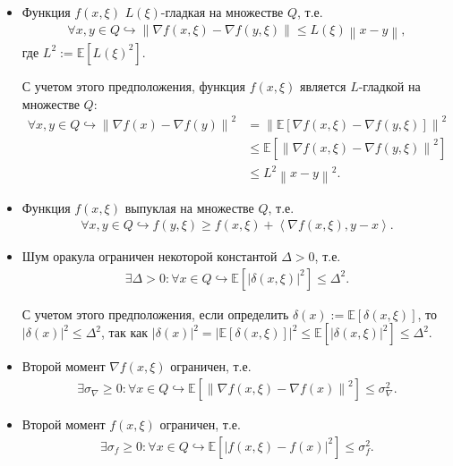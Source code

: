     \begin{itemize}
        \item Функция $f(x, \xi)$ $L(\xi)$-гладкая на множестве $Q$, т.е.
        \begin{align} \label{ass:smooth_stoch}   
            \forall x, y \in Q \hookrightarrow \left\| \nabla f(x, \xi) - \nabla f(y, \xi) \right\| \leq L(\xi) \left\| x - y \right\|,
        \end{align}
        где $L^2 := \mathbb{E} \left[ L(\xi)^2 \right]$.
        
        С учетом этого предположения, функция $f(x, \xi)$ является $L$-гладкой на множестве $Q$:
        \begin{align*}
            \forall x, y \in Q \hookrightarrow \left\| \nabla f(x) - \nabla f(y) \right\|^2
            &=
            \left\| \mathbb{E} \left[ \nabla f(x, \xi) - \nabla f(y, \xi) \right] \right\|^2 \\ 
            &\leq
            \mathbb{E} \left[ \left\| \nabla f(x, \xi) - \nabla f(y, \xi) \right\|^2 \right] \\
            &\leq 
            L^2 \left\| x - y \right\|^2.
        \end{align*}
        
        \item Функция $f(x, \xi)$ выпуклая на множестве $Q$, т.е.
        \begin{align} \label{ass:conv_stoch}
            \forall x, y \in Q \hookrightarrow f(y, \xi) \geq f(x, \xi) + \left< \nabla f(x, \xi), y - x \right>.
        \end{align}
        
        \item  Шум оракула ограничен некоторой константой $\Delta > 0$, т.е.
        \begin{align} \label{ass:bounded_stoch}
            \exists \Delta > 0 : \forall x \in Q \hookrightarrow \mathbb{E} \left[ |\delta(x, \xi)|^2 \right] \leq \Delta^2.
        \end{align}

        С учетом этого предположения, если определить $\delta(x) := \mathbb{E} \left[ \delta(x, \xi) \right]$, то $|\delta(x)|^2 \leq \Delta^2$, так как $|\delta(x)|^2 = \left| \mathbb{E} \left[ \delta(x, \xi) \right] \right|^2 \leq \mathbb{E} \left[ |\delta(x, \xi)|^2 \right] \leq \Delta^2$.
        \item  Второй момент $\nabla f(x, \xi)$ ограничен, т.е.
        \begin{align} \label{ass:sigma_nabla}
            \exists \sigma_\nabla \geq 0 : \forall x \in Q \hookrightarrow \mathbb{E} \left[ \left\| \nabla f(x, \xi) - \nabla f(x) \right\|^2 \right] \leq \sigma^2_\nabla.
        \end{align}
        \item Второй момент $f(x, \xi)$ ограничен, т.е.
        \begin{align} \label{ass:sigma_f}
            \exists \sigma_f \geq 0 : \forall x \in Q \hookrightarrow \mathbb{E} \left[ \left| f(x, \xi) - f(x) \right|^2 \right] \leq \sigma^2_f.
        \end{align}
    \end{itemize}